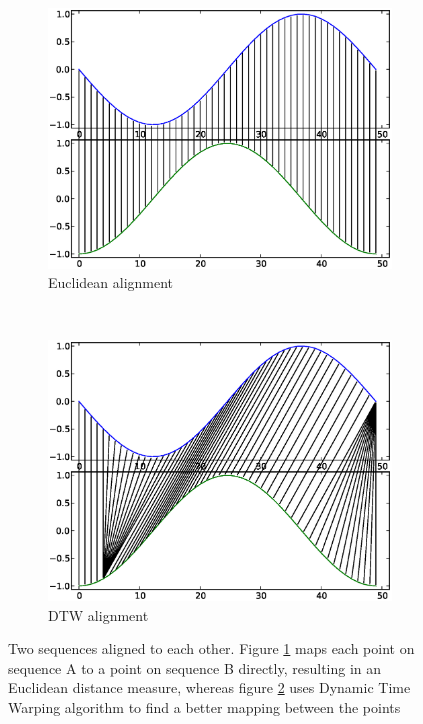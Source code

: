 \documentclass[parskip]{cs4rep}
\begin{document}
\begin{figure}[t,b]
   \centering
   \begin{subfigure}[b]{0.4\textwidth}
       \centering
       \includegraphics[width=\textwidth]{figures/DTW/sin-cos-no-dtw.eps}
       \caption{Euclidean alignment}
       \label{fig:DTW:euclidean_alignment}
   \end{subfigure}
   ~
   \begin{subfigure}[b]{0.4\textwidth}
       \centering
       \includegraphics[width=\textwidth]{figures/DTW/sin-cos-dtw.eps}
       \caption{DTW alignment}
       \label{fig:DTW:dtw_alignment}
   \end{subfigure}
   
   \caption{Two sequences aligned to each other. Figure \ref{fig:DTW:euclidean_alignment} maps each point on sequence A to a point on sequence B directly, resulting in an Euclidean distance measure, whereas figure \ref{fig:DTW:dtw_alignment} uses Dynamic Time Warping algorithm to find a better mapping between the points}
   \label{fig:DTW:alignments}
\end{figure}
\end{document}
